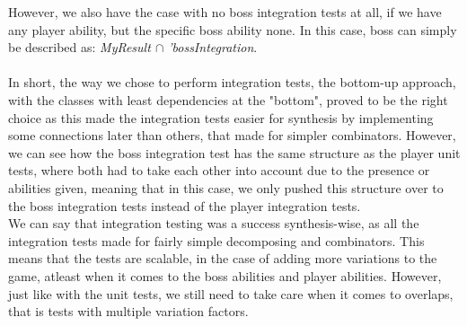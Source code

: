 However, we also have the case with no boss integration tests at all, if we have any player ability, but the specific boss ability none. In this case, boss can simply be described as: \textit{MyResult $\cap$ 'bossIntegration}. \\
\\
In short, the way we chose to perform integration tests, the bottom-up approach, with the classes with least dependencies at the "bottom", proved to be the right choice as this made the integration tests easier for synthesis by implementing some connections later than others, that made for simpler combinators. However, we can see how the boss integration test has the same structure as the player unit tests, where both had to take each other into account due to the presence or abilities given, meaning that in this case, we only pushed this structure over to the boss integration tests instead of the player integration tests. \\
We can say that integration testing was a success synthesis-wise, as all the integration tests made for fairly simple decomposing and combinators. This means that the tests are scalable, in the case of adding more variations to the game, atleast when it comes to the boss abilities and player abilities. However, just like with the unit tests, we still need to take care when it comes to overlaps, that is tests with multiple variation factors.
